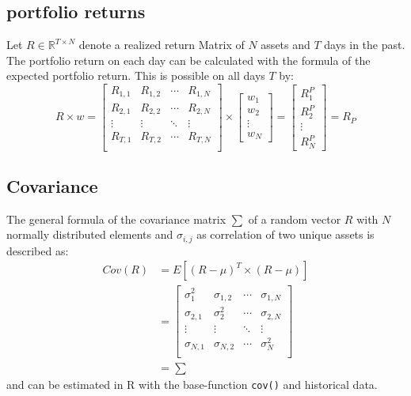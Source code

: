 \documentclass[
  oneside]{book}
\begin{document}
\hypertarget{portfolio-returns}{%
\subsection{portfolio returns}\label{portfolio-returns}}

Let \(R \in \mathbb{R}^{T \times N}\) denote a realized return Matrix of \(N\) assets and \(T\) days in the past. The portfolio return on each day can be calculated with the formula of the expected portfolio return. This is possible on all days \(T\) by:
\[
  R \times w = 
  \begin{bmatrix}
    R_{1, 1} & R_{1, 2} & \cdots & R_{1, N} \\
    R_{2, 1} & R_{2, 2} & \cdots & R_{2, N} \\
    \vdots  & \vdots & \ddots & \vdots \\
    R_{T, 1} & R_{T, 2} & \cdots & R_{T, N} \\
 \end{bmatrix}
  \times 
  \begin{bmatrix}
    w_{1} \\ 
    w_{2} \\
    \vdots \\
    w_{N}  
 \end{bmatrix}
 =
   \begin{bmatrix}
    R_{1}^P \\ 
    R_{2}^P \\
    \vdots \\
    R_{N}^P  
 \end{bmatrix}
 =
 R_P
\]

\hypertarget{covariance}{%
\subsection{Covariance}\label{covariance}}

The general formula of the covariance matrix \(\sum\) of a random vector \(R\) with \(N\) normally distributed elements and \(\sigma_{i,j}\) as correlation of two unique assets is described as:
\begin{align*}
  Cov(R) &= E[(R-\mu)^T \times (R-\mu)] \\
  &=   \begin{bmatrix}
    \sigma_1^2 & \sigma_{1,2} & \cdots & \sigma_{1,N} \\
    \sigma_{2, 1} & \sigma_2^2 & \cdots & \sigma_{2, N} \\
    \vdots  & \vdots & \ddots & \vdots \\
    \sigma_{N, 1} & \sigma_{N, 2} & \cdots & \sigma_N^2 \\
 \end{bmatrix}\\
  &=\sum
\end{align*}
and can be estimated in R with the base-function \texttt{cov()} and historical data.
\end{document}
